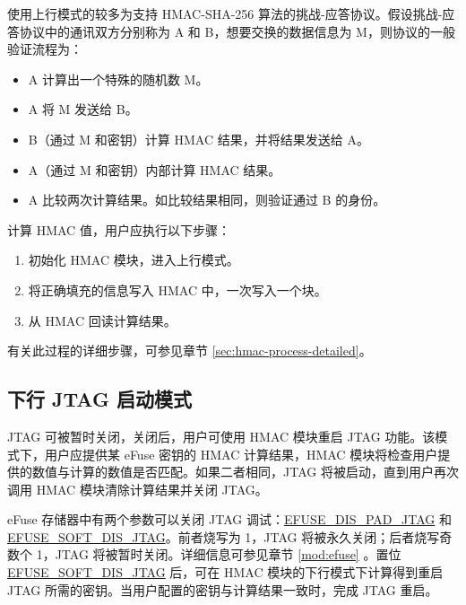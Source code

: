 \documentclass[main\_\_CN.tex]{subfiles}
\begin{document}
使用上行模式的较多为支持 HMAC-SHA-256 算法的挑战-应答协议。假设挑战-应答协议中的通讯双方分别称为 A 和 B，想要交换的数据信息为 M，则协议的一般验证流程为：

\begin{itemize}
    \item A 计算出一个特殊的随机数 M。
    \item A 将 M 发送给 B。
    \item B（通过 M 和密钥）计算 HMAC 结果，并将结果发送给 A。
    \item A（通过 M 和密钥）内部计算 HMAC 结果。
    \item A 比较两次计算结果。如比较结果相同，则验证通过 B 的身份。
\end{itemize}

计算 HMAC 值，用户应执行以下步骤：

\begin{enumerate}
    \item 初始化 HMAC 模块，进入上行模式。
    \item 将正确填充的信息写入 HMAC 中，一次写入一个块。
    \item 从 HMAC 回读计算结果。
\end{enumerate}

有关此过程的详细步骤，可参见章节 \ref{sec:hmac-process-detailed}。

\subsection{下行 JTAG 启动模式}

JTAG 可被暂时关闭，关闭后，用户可使用 HMAC 模块重启 JTAG 功能。该模式下，用户应提供某 eFuse 密钥的 HMAC 计算结果，HMAC 模块将检查用户提供的数值与计算的数值是否匹配。如果二者相同，JTAG 将被启动，直到用户再次调用 HMAC 模块清除计算结果并关闭 JTAG。

eFuse 存储器中有两个参数可以关闭 JTAG 调试：\hyperref[fielddesc:EFUSEDISPADJTAG]{EFUSE\_DIS\_PAD\_JTAG} 和 \hyperref[fielddesc:EFUSESOFTDISJTAG]{EFUSE\_SOFT\_DIS\_JTAG}。前者烧写为 1，JTAG 将被永久关闭；后者烧写奇数个 1，JTAG 将被暂时关闭。详细信息可参见章节 \ref{mod:efuse} \textit{}。置位 \hyperref[fielddesc:EFUSESOFTDISJTAG]{EFUSE\_SOFT\_DIS\_JTAG} 后，可在 HMAC 模块的下行模式下计算得到重启 JTAG 所需的密钥。当用户配置的密钥与计算结果一致时，完成 JTAG 重启。
\end{document}
